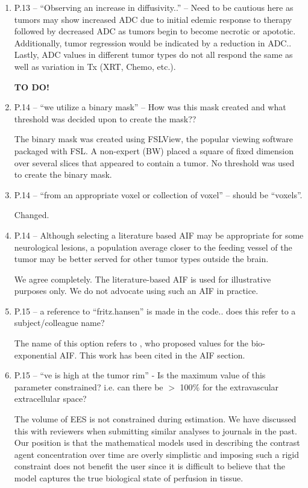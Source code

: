 \documentclass[11pt]{article}
\begin{document}
\begin{enumerate}
\item P.13 – ``Observing an increase in diffusivity..'' – Need to be
  cautious here as tumors may show increased ADC due to initial edemic
  response to therapy followed by decreased ADC as tumors begin to
  become necrotic or apototic. Additionally, tumor regression would be
  indicated by a reduction in ADC.. Lastly, ADC values in different
  tumor types do not all respond the same as well as variation in Tx
  (XRT, Chemo, etc.).

  \textbf{TO DO!}  

\item P.14 – ``we utilize a binary mask'' – How was this mask created
  and what threshold was decided upon to create the mask??

  The binary mask was created using FSLView, the popular viewing
  software packaged with FSL.  A non-expert (BW) placed a square of
  fixed dimension over several slices that appeared to contain a
  tumor.  No threshold was used to create the binary mask.

\item P.14 – ``from an appropriate voxel or collection of voxel'' –
  should be ``voxels''.

  Changed.

\item P.14 – Although selecting a literature based AIF may be
  appropriate for some neurological lesions, a population average
  closer to the feeding vessel of the tumor may be better served for
  other tumor types outside the brain.

  We agree completely.  The literature-based AIF is used for
  illustrative purposes only.  We do not advocate using such an AIF in
  practice.

\item P.15 – a reference to ``fritz.hansen'' is made in the
  code.. does this refer to a subject/colleague name?

  The name of this option refers to \citet{fri-etal:measurement}, who
  proposed values for the bio-exponential AIF.  This work has been
  cited in the AIF section.

\item P.15 – ``ve is high at the tumor rim'' - Is the maximum value of
  this parameter constrained? i.e. can there be $>$ 100\% for the
  extravascular extracellular space?

  The volume of EES is not constrained during estimation.  We have
  discussed this with reviewers when submitting similar analyses to
  journals in the past.  Our position is that the mathematical models
  used in describing the contrast agent concentration over time are
  overly simplistic and imposing such a rigid constraint does not
  benefit the user since it is difficult to believe that the model
  captures the true biological state of perfusion in tissue.


\end{enumerate}
\end{document}
